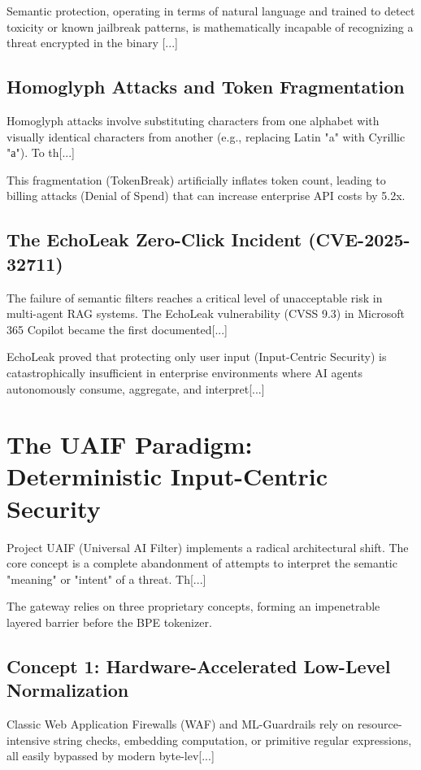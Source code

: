 \documentclass[10pt,a4paper]{article}
\begin{document}
Semantic protection, operating in terms of natural language and trained to detect toxicity or known jailbreak patterns, is mathematically incapable of recognizing a threat encrypted in the binary [...]

\subsection{Homoglyph Attacks and Token Fragmentation}
Homoglyph attacks involve substituting characters from one alphabet with visually identical characters from another (e.g., replacing Latin "a" with Cyrillic "\foreignlanguage{russian}{а}"). To th[...]

This fragmentation (TokenBreak) artificially inflates token count, leading to billing attacks (Denial of Spend) that can increase enterprise API costs by 5.2x.

\subsection{The EchoLeak Zero-Click Incident (CVE-2025-32711)}
The failure of semantic filters reaches a critical level of unacceptable risk in multi-agent RAG systems. The EchoLeak vulnerability (CVSS 9.3) in Microsoft 365 Copilot became the first documented[...]

EchoLeak proved that protecting only user input (Input-Centric Security) is catastrophically insufficient in enterprise environments where AI agents autonomously consume, aggregate, and interpret[...]

\section{The UAIF Paradigm: Deterministic Input-Centric Security}
Project UAIF (Universal AI Filter) implements a radical architectural shift. The core concept is a complete abandonment of attempts to interpret the semantic "meaning" or "intent" of a threat. Th[...]

The gateway relies on three proprietary concepts, forming an impenetrable layered barrier before the BPE tokenizer.

\subsection{Concept 1: Hardware-Accelerated Low-Level Normalization}
Classic Web Application Firewalls (WAF) and ML-Guardrails rely on resource-intensive string checks, embedding computation, or primitive regular expressions, all easily bypassed by modern byte-lev[...]
\end{document}

